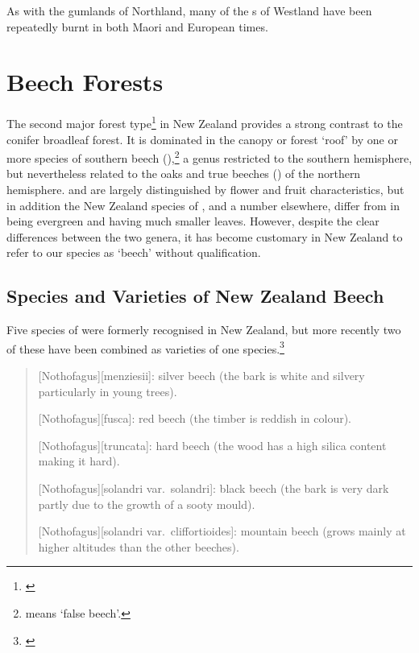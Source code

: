 As with the gumlands of Northland, many of the s of Westland have been repeatedly burnt in both Maori and European times.

\chapter{Beech Forests}

The second major forest type\footnote{\cite{wardle1984beeches}} in New Zealand provides a strong contrast to the conifer broadleaf forest.
It is dominated in the canopy or forest `roof' by one or more species of southern beech (),\footnote{ means `false beech'.} a genus restricted to the southern hemisphere, but nevertheless related to the oaks and true beeches () of the northern hemisphere.  and  are largely distinguished by flower and fruit characteristics, but in addition the New Zealand species of , and a number elsewhere, differ from  in being evergreen and having much smaller leaves.
However, despite the clear differences between the two genera, it has become customary in New Zealand to refer to our species as `beech' without qualification.

\section{Species and Varieties of New Zealand Beech}

Five species of  were formerly recognised in New Zealand, but more recently two of these have been combined as varieties of one species.\footnote{\cite{poole1958studies}}

\begin{quote}
	[Nothofagus][menziesii]: silver beech (the bark is white and silvery particularly in young trees).

	[Nothofagus][fusca]: red beech (the timber is reddish in colour).

	[Nothofagus][truncata]: hard beech (the wood has a high silica content making it hard).

	[Nothofagus][solandri var.\ solandri]: black beech (the bark is very dark partly due to the growth of a sooty mould).

	[Nothofagus][solandri var.\ cliffortioides]: mountain beech (grows mainly at higher altitudes than the other beeches).
\end{quote}

